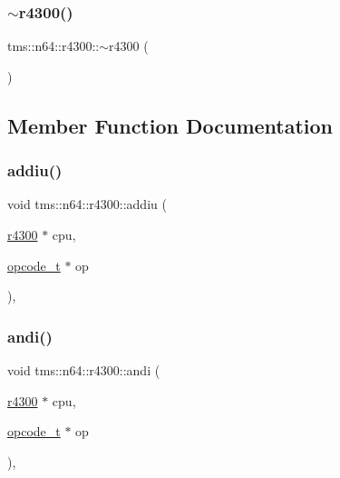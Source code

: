 \mbox{\label{classtms_1_1n64_1_1r4300_a0a7c3a69dcf964723aab0864ee68c6eb}} 
\subsubsection{\texorpdfstring{$\sim$r4300()}{~r4300()}}
{\footnotesize\ttfamily tms\+::n64\+::r4300\+::$\sim$r4300 (\begin{DoxyParamCaption}{ }\end{DoxyParamCaption})}



\subsection{Member Function Documentation}
\mbox{\label{classtms_1_1n64_1_1r4300_a0aee4fab6ffe578b070beffad4e6f6b2}} 
\subsubsection{\texorpdfstring{addiu()}{addiu()}}
{\footnotesize\ttfamily void tms\+::n64\+::r4300\+::addiu (\begin{DoxyParamCaption}\item[{\hyperlink{classtms_1_1n64_1_1r4300}{r4300} $\ast$}]{cpu,  }\item[{\hyperlink{classtms_1_1n64_1_1opcode__t}{opcode\+\_\+t} $\ast$}]{op }\end{DoxyParamCaption})\hspace{0.3cm}{\ttfamily [static]}, {\ttfamily [private]}}

\mbox{\label{classtms_1_1n64_1_1r4300_a3e0d4f4eb35534060bf83f0d455fae35}} 
\subsubsection{\texorpdfstring{andi()}{andi()}}
{\footnotesize\ttfamily void tms\+::n64\+::r4300\+::andi (\begin{DoxyParamCaption}\item[{\hyperlink{classtms_1_1n64_1_1r4300}{r4300} $\ast$}]{cpu,  }\item[{\hyperlink{classtms_1_1n64_1_1opcode__t}{opcode\+\_\+t} $\ast$}]{op }\end{DoxyParamCaption})\hspace{0.3cm}{\ttfamily [static]}, {\ttfamily [private]}}

